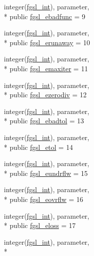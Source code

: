\begin{DoxyCompactItemize}
\item 
integer(\hyperlink{classfgsl_a222deda1d7a0c0e845ce4a683318efeb}{fgsl\-\_\-int}), parameter, \\*
public \hyperlink{classfgsl_aee7266f310ad4022066e6fe82eecc0f9}{fgsl\-\_\-ebadfunc} = 9
\item 
integer(\hyperlink{classfgsl_a222deda1d7a0c0e845ce4a683318efeb}{fgsl\-\_\-int}), parameter, \\*
public \hyperlink{classfgsl_a89dc8311615f753f8b0b83a60e5f16c0}{fgsl\-\_\-erunaway} = 10
\item 
integer(\hyperlink{classfgsl_a222deda1d7a0c0e845ce4a683318efeb}{fgsl\-\_\-int}), parameter, \\*
public \hyperlink{classfgsl_a5e63249fa198903f233261cb159a3e28}{fgsl\-\_\-emaxiter} = 11
\item 
integer(\hyperlink{classfgsl_a222deda1d7a0c0e845ce4a683318efeb}{fgsl\-\_\-int}), parameter, \\*
public \hyperlink{classfgsl_a13b65889d69077a99a6f13522883061f}{fgsl\-\_\-ezerodiv} = 12
\item 
integer(\hyperlink{classfgsl_a222deda1d7a0c0e845ce4a683318efeb}{fgsl\-\_\-int}), parameter, \\*
public \hyperlink{classfgsl_a3df3fe39582721655da00574f4b021d1}{fgsl\-\_\-ebadtol} = 13
\item 
integer(\hyperlink{classfgsl_a222deda1d7a0c0e845ce4a683318efeb}{fgsl\-\_\-int}), parameter, \\*
public \hyperlink{classfgsl_a7e4da7bbb4435c2bceff8cf57d554015}{fgsl\-\_\-etol} = 14
\item 
integer(\hyperlink{classfgsl_a222deda1d7a0c0e845ce4a683318efeb}{fgsl\-\_\-int}), parameter, \\*
public \hyperlink{classfgsl_ae5ac5a32777e537541e47cb0419da46c}{fgsl\-\_\-eundrflw} = 15
\item 
integer(\hyperlink{classfgsl_a222deda1d7a0c0e845ce4a683318efeb}{fgsl\-\_\-int}), parameter, \\*
public \hyperlink{classfgsl_a7dc79e0a3af443223d2320c5e2b7b803}{fgsl\-\_\-eovrflw} = 16
\item 
integer(\hyperlink{classfgsl_a222deda1d7a0c0e845ce4a683318efeb}{fgsl\-\_\-int}), parameter, \\*
public \hyperlink{classfgsl_afdf53f6a99fb8880de40cd8136bf8e1c}{fgsl\-\_\-eloss} = 17
\item 
integer(\hyperlink{classfgsl_a222deda1d7a0c0e845ce4a683318efeb}{fgsl\-\_\-int}), parameter, \\*

\end{DoxyCompactItemize}
